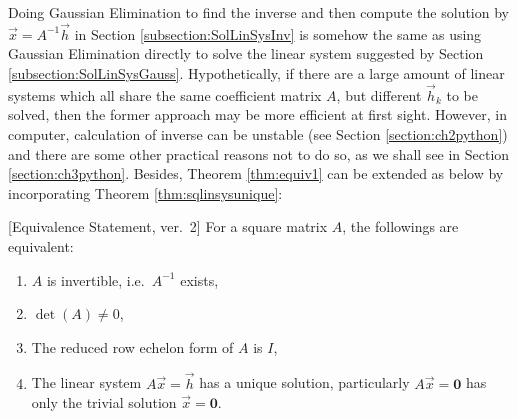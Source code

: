 Doing Gaussian Elimination to find the inverse and then compute the solution by $\vec{x} = A^{-1}\vec{h}$ in Section \ref{subsection:SolLinSysInv} is somehow the same as using Gaussian Elimination directly to solve the linear system suggested by Section \ref{subsection:SolLinSysGauss}. Hypothetically, if there are a large amount of linear systems which all share the same coefficient matrix $A$, but different $\vec{h}_k$ to be solved, then the former approach may be more efficient at first sight. However, in computer, calculation of inverse can be unstable (see Section \ref{section:ch2python}) and there are some other practical reasons not to do so, as we shall see in Section \ref{section:ch3python}. Besides, Theorem \ref{thm:equiv1} can be extended as below by incorporating Theorem \ref{thm:sqlinsysunique}:
\begin{thm}
\label{thm:equiv2}[Equivalence Statement, ver.\ 2]
For a square matrix $A$, the followings are equivalent:
\begin{enumerate}[label=(\alph*)]
\item $A$ is invertible, i.e.\ $A^{-1}$ exists,
\item $\det(A) \neq 0$,
\item The reduced row echelon form of $A$ is $I$,
\item The linear system $A\vec{x} = \vec{h}$ has a unique solution, particularly $A\vec{x} = \textbf{0}$ has only the trivial solution $\vec{x} = \textbf{0}$.
\end{enumerate}
\end{thm}

